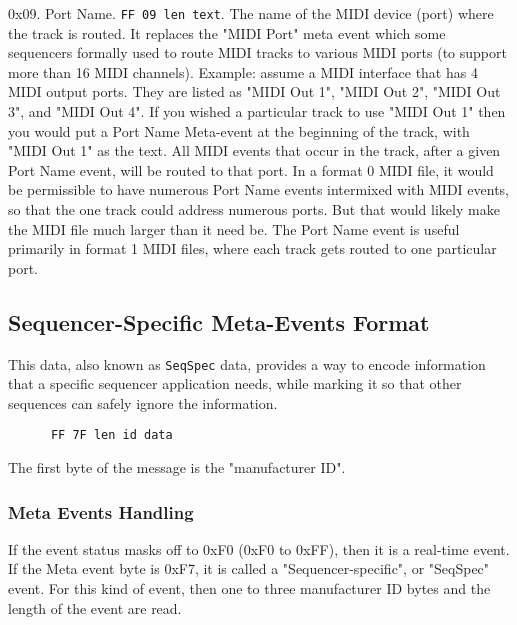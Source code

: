 \begin{enumber}
      \item 0x09.
         Port Name. \texttt{FF 09 len text}.
         The name of the MIDI device (port) where the track is routed. It
         replaces the "MIDI Port" meta event which some sequencers formally
         used to route MIDI tracks to various MIDI ports (to support
         more than 16 MIDI channels). Example: assume a
         MIDI interface that has 4 MIDI output ports. They are listed as
         "MIDI Out 1", "MIDI Out 2", "MIDI Out 3", and "MIDI Out 4". If you
         wished a particular track to use "MIDI Out 1" then you would put a
         Port Name Meta-event at the beginning of the track, with "MIDI Out
         1" as the text. All MIDI events that occur in the track, after a
         given Port Name event, will be routed to that port. In a format 0
         MIDI file, it would be permissible to have numerous Port Name events
         intermixed with MIDI events, so that the one track could address
         numerous ports. But that would likely make the MIDI file much larger
         than it need be. The Port Name event is useful primarily in format 1
         MIDI files, where each track gets routed to one particular port.
   \end{enumber}

\subsection{Sequencer-Specific Meta-Events Format}
\label{subsec:midi_meta_format}

   This data, also known as
   \texttt{SeqSpec} data, provides a way to encode information
   that a specific sequencer application needs, while marking it so that other
   sequences can safely ignore the information.

   \begin{verbatim}
      FF 7F len id data
   \end{verbatim}

   The first byte of the message is the "manufacturer ID".


\subsubsection{Meta Events Handling}
\label{subsubsec:midi_meta_events_revisited}

   If the event status masks off to 0xF0 (0xF0 to 0xFF), then it is a 
   real-time event.
   If the Meta event byte is 0xF7, it is called a "Sequencer-specific",
   or "SeqSpec" event.  For this kind of event, then one to three manufacturer
   ID bytes and the length of the event are read.


